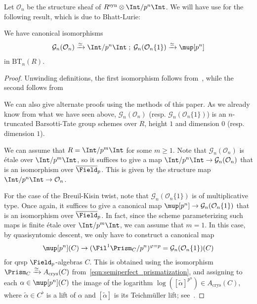 \documentclass[10pt]{amsart}
\begin{document}
Let $\mathcal{O}_n$ be the structure sheaf of $R^{\mathrm{syn}}\otimes\Int/p^n\Int$. We will have use for the following result, which is due to Bhatt-Lurie:
\begin{proposition}
\label{prop:the_case_of_mupn_bhatt_lurie}
We have canonical isomorphisms
\[
\mathcal{G}_n(\mathcal{O}_n)\xrightarrow{\simeq}\Int/p^n\Int\;;\;\mathcal{G}_n(\mathcal{O}_n\{1\})\xrightarrow{\simeq}\mup[p^n]
\]
in $\mathrm{BT}_n(R)$.
\end{proposition}
\begin{proof}
Unwinding definitions, the first isomorphism follows from~\cite[Theorem 8.1.9]{bhatt2022absolute}, while the second follows from~\cite[Theorem 7.5.6]{bhatt2022absolute}

We can also give alternate proofs using the methods of this paper. As we already know from what we have seen above, $\mathcal{G}_n(\mathcal{O}_n)$ (resp.  $\mathcal{G}_n(\mathcal{O}_n\{1\})$) is an $n$-truncated Barsotti-Tate group schemes over $R$, height $1$ and dimension $0$ (resp. dimension $1$).

We can assume that $R = \Int/p^m\Int$ for some $m\ge 1$. Note that $\mathcal{G}_n(\mathcal{O}_n)$ is \'etale over $\Int/p^m\Int$, so it suffices to give a map $\Int/p^n\Int\to \mathcal{G}_n(\mathcal{O}_n)$ that is an isomorphism over $\overline{\Field}_p$. This is given by the structure map $\Int/p^n\Int\to \mathcal{O}_n$.

For the case of the Breuil-Kisin twist, note that $\mathcal{G}_n(\mathcal{O}_n\{1\})$ is of multiplicative type. Once again, it suffices to give a canonical map $\mup[p^n]\to \mathcal{G}_n(\mathcal{O}_n\{1\})$ that is an isomorphism over $\overline{\Field}_p$. In fact, since the scheme parameterizing such maps is finite \'etale over $\Int/p^m\Int$, we can assume that $m = 1$. In this case, by quasisyntomic descent, we only have to construct a canonical map 
\begin{align}\label{eqn:mupn_to_Acrys}
\mup[p^n](C)\to (\Fil^1\Prism_C/p^n)^{\varphi = p} = \mathcal{G}_n(\mathcal{O}_n\{1\})(C)
\end{align}
for qrsp $\Field_p$-algebras $C$. This is obtained using the isomorphism $\Prism_C\xrightarrow{\simeq}A_{\mathrm{crys}}(C)$ from~\eqref{eqn:semiperfect_prismatization}, and assigning to each $\alpha\in \mup[p^n](C)$ the image of the logarithm $\log([\tilde{\alpha}]^{p^n})\in A_{\mathrm{crys}}(C)$, where $\tilde{\alpha}\in C^\flat$ is a lift of $\alpha$ and $[\tilde{\alpha}]$ is its Teichm\"uller lift; see~\cite[\S 7.1]{bhatt2022absolute}.


\end{proof}
\end{document}
